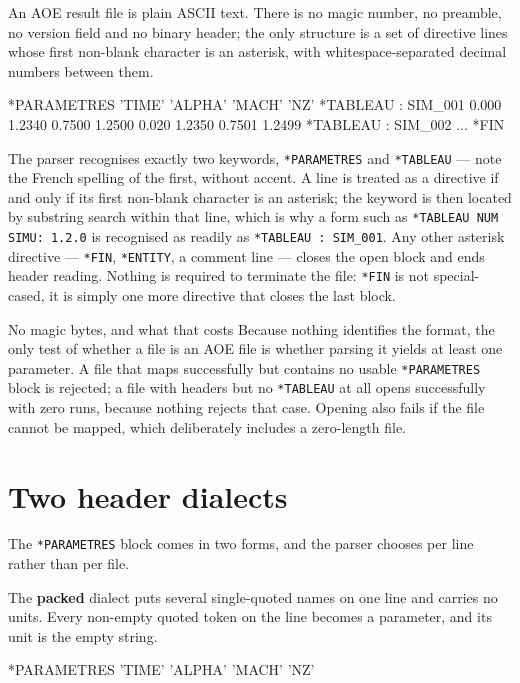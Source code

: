 \documentclass[11pt,a4paper,oneside]{report}
\newcommand{\code}[1]{\texttt{#1}}
\begin{document}
An AOE result file is plain ASCII text. There is no magic number, no preamble, no
version field and no binary header; the only structure is a set of directive
lines whose first non-blank character is an asterisk, with whitespace-separated
decimal numbers between them.

\begin{aoecode}
*PARAMETRES
 'TIME'   'ALPHA'  'MACH'  'NZ'
*TABLEAU : SIM_001
 0.000 1.2340 0.7500 1.2500
 0.020 1.2350 0.7501 1.2499
*TABLEAU : SIM_002
 ...
*FIN
\end{aoecode}

The parser recognises exactly two keywords, \code{*PARAMETRES} and
\code{*TABLEAU} --- note the French spelling of the first, without accent. A line
is treated as a directive if and only if its first non-blank character is an
asterisk; the keyword is then located by substring search within that line, which
is why a form such as \code{*TABLEAU NUM SIMU: 1.2.0} is recognised as readily as
\code{*TABLEAU : SIM\_001}. Any other asterisk directive --- \code{*FIN},
\code{*ENTITY}, a comment line --- closes the open block and ends header reading.
Nothing is required to terminate the file: \code{*FIN} is not special-cased, it
is simply one more directive that closes the last block.

\begin{aoenote}{No magic bytes, and what that costs}
Because nothing identifies the format, the only test of whether a file is an AOE
file is whether parsing it yields at least one parameter. A file that maps
successfully but contains no usable \code{*PARAMETRES} block is rejected; a file
with headers but no \code{*TABLEAU} at all opens successfully with zero runs,
because nothing rejects that case. Opening also fails if the file cannot be
mapped, which deliberately includes a zero-length file.
\end{aoenote}

\section{Two header dialects}

The \code{*PARAMETRES} block comes in two forms, and the parser chooses per line
rather than per file.

The \textbf{packed} dialect puts several single-quoted names on one line and
carries no units. Every non-empty quoted token on the line becomes a parameter,
and its unit is the empty string.

\begin{aoecode}
*PARAMETRES
 'TIME'   'ALPHA'   'MACH'   'NZ'
\end{aoecode}
\end{document}

